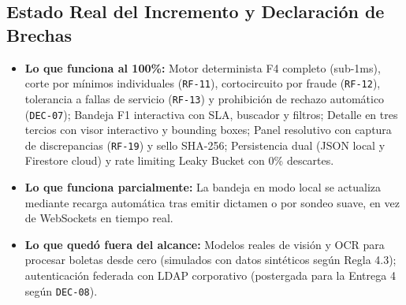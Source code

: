 \documentclass[11pt,letterpaper]{article}
\begin{document}
\begin{center}
\end{center}

\begin{center}
\end{center}

\subsection{Estado Real del Incremento y Declaración de Brechas}
\begin{itemize}
    \item \textbf{Lo que funciona al 100\%:} Motor determinista F4 completo (sub-1ms), corte por mínimos individuales (\texttt{RF-11}), cortocircuito por fraude (\texttt{RF-12}), tolerancia a fallas de servicio (\texttt{RF-13}) y prohibición de rechazo automático (\texttt{DEC-07}); Bandeja F1 interactiva con SLA, buscador y filtros; Detalle en tres tercios con visor interactivo y bounding boxes; Panel resolutivo con captura de discrepancias (\texttt{RF-19}) y sello SHA-256; Persistencia dual (JSON local y Firestore cloud) y rate limiting Leaky Bucket con 0\% descartes.
    \item \textbf{Lo que funciona parcialmente:} La bandeja en modo local se actualiza mediante recarga automática tras emitir dictamen o por sondeo suave, en vez de WebSockets en tiempo real.
    \item \textbf{Lo que quedó fuera del alcance:} Modelos reales de visión y OCR para procesar boletas desde cero (simulados con datos sintéticos según Regla 4.3); autenticación federada con LDAP corporativo (postergada para la Entrega 4 según \texttt{DEC-08}).
\end{itemize}
\end{document}

